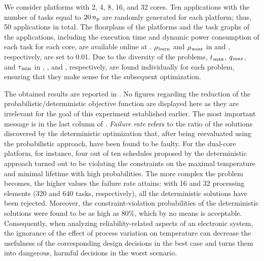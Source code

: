 
We consider platforms with 2, 4, 8, 16, and 32 cores.
Ten applications with the number of tasks equal to $20 \, {n_\text{p}}$ are randomly generated for each platform; thus, 50 applications in total.
The floorplans of the platforms and the task graphs of the applications, including the execution time and dynamic power consumption of each task for each core, are available online at \cite{sources}.
$\rho_{\text{\kern0.1emburn}}$ and $\rho_{\text{\kern0.1emwear}}$ in  and , respectively, are set to 0.01.
Due to the diversity of the problems, $t_{\text{\kern0.1emmax}}$, $q_{\text{\kern0.1emmax}}$, and $\tau_{\text{\kern0.1emmin}}$ in , , and , respectively, are found individually for each problem, ensuring that they make sense for the subsequent optimization.

The obtained results are reported in .
No figures regarding the reduction of the probabilistic/deterministic objective function are displayed here as they are irrelevant for the goal of this experiment established earlier.
The most important message is in the last column of .
\emph{Failure rate} refers to the ratio of the solutions discovered by the deterministic optimization that, after being reevaluated using the probabilistic approach, have been found to be faulty.
For the dual-core platform, for instance, four out of ten schedules proposed by the deterministic approach turned out to be violating the constraints on the maximal temperature and minimal lifetime with high probabilities.
The more complex the problem becomes, the higher values the failure rate attains: with 16 and 32 processing elements (320 and 640 tasks, respectively), all the deterministic solutions have been rejected.
Moreover, the constraint-violation probabilities of the deterministic solutions were found to be as high as 80\%, which by no means is acceptable.
Consequently, when analyzing reliability-related aspects of an electronic system, the ignorance of the effect of process variation on temperature can decrease the usefulness of the corresponding design decisions in the best case and turns them into dangerous, harmful decisions in the worst scenario.
